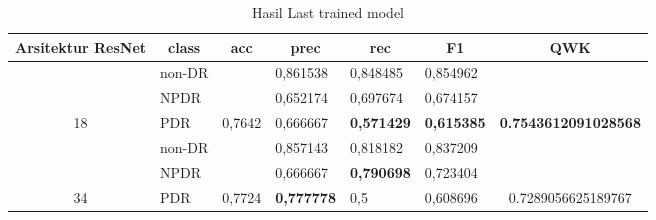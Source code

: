 \begin{table}[hbtp]
	\begin{center}
		\caption{Hasil Last trained model}
		\label{tb:HasilLastDefault}
		\begin{tabular}{|c|l|c|l|l|l|c|}
			\hline
			\rowcolor[HTML]{C0C0C0} 
			Arsitektur ResNet   & \multicolumn{1}{c|}{\cellcolor[HTML]{C0C0C0}class} & acc                      & \multicolumn{1}{c|}{\cellcolor[HTML]{C0C0C0}prec} & \multicolumn{1}{c|}{\cellcolor[HTML]{C0C0C0}rec} & \multicolumn{1}{c|}{\cellcolor[HTML]{C0C0C0}F1} & QWK                                  \\ \hline
			& non-DR                                             &                          & 0,861538                                          & 0,848485                                         & 0,854962                                        &                                      \\ \cline{2-2} \cline{4-6}
			& NPDR                                               &                          & 0,652174                                          & 0,697674                                         & 0,674157                                        &                                      \\ \cline{2-2} \cline{4-6}
			\multirow{-3}{*}{18}  & PDR                                                & \multirow{-3}{*}{0,7642} & 0,666667                                          & \textbf{0,571429}                                         & \textbf{0,615385}                                        & \multirow{-3}{*}{\textbf{0.7543612091028568}} \\ \hline
			& non-DR                                             &                          & 0,857143                                          & 0,818182                                         & 0,837209                                        &                                      \\ \cline{2-2} \cline{4-6}
			& NPDR                                               &                          & 0,666667                                          & \textbf{0,790698}                                         & 0,723404                                        &                                      \\ \cline{2-2} \cline{4-6}
			\multirow{-3}{*}{34}  & PDR                                                & \multirow{-3}{*}{0,7724} & \textbf{0,777778}                                          & 0,5                                              & 0,608696                                        & \multirow{-3}{*}{0.7289056625189767} \\ \hline

\end{tabular}
\end{center}
\end{table}
